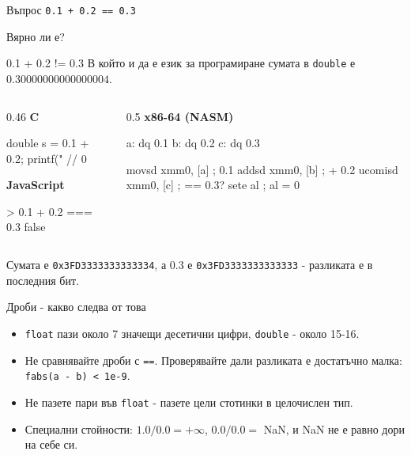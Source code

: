 \documentclass[14pt, aspectratio=169]{beamer}
\begin{document}
\begin{frame}{Въпрос}
  \centering
  \vfill
  {\Large\texttt{0.1 + 0.2 == 0.3}}

  \bigskip
  Вярно ли е?
  \vfill
\end{frame}

\begin{frame}[fragile]{0.1 + 0.2 != 0.3}
  \noindent В който и да е език за програмиране сумата в \texttt{double} е
  $0.30000000000000004$.
  \medskip

  \begin{columns}[T]
    \begin{column}{0.46\textwidth}
      \small\textbf{C}
\begin{semiverbatim}\scriptsize
double s = 0.1 + 0.2;
printf("%
// 0
\end{semiverbatim}
      \seg
      \small\textbf{JavaScript}
\begin{semiverbatim}\scriptsize
> 0.1 + 0.2 === 0.3
false
\end{semiverbatim}
    \end{column}
    \begin{column}{0.5\textwidth}
      \seg
      \small\textbf{x86-64 (NASM)}
\begin{semiverbatim}\scriptsize
a:  dq 0.1
b:  dq 0.2
c:  dq 0.3

movsd   xmm0, [a]  ; 0.1
addsd   xmm0, [b]  ; + 0.2
ucomisd xmm0, [c]  ; == 0.3?
sete    al         ; al = 0
\end{semiverbatim}
    \end{column}
  \end{columns}
  \seg
  \medskip
  \noindent\small Сумата е \texttt{0x3FD3333333333334}, а $0.3$ е
  \texttt{0x3FD3333333333333} - разликата е в последния бит.
\end{frame}

\begin{frame}{Дроби - какво следва от това}
  \begin{itemize}
    \item \texttt{float} пази около 7 значещи десетични цифри, \texttt{double} -
      около 15-16.
    \item Не сравнявайте дроби с \texttt{==}. Проверявайте дали разликата е
      достатъчно малка: \texttt{fabs(a - b) < 1e-9}.
    \item Не пазете пари във \texttt{float} - пазете цели стотинки в
      целочислен тип.
    \item Специални стойности: $1.0 / 0.0 = +\infty$, $0.0 / 0.0 =$ NaN, и NaN
      не е равно дори на себе си.
  \end{itemize}
\end{frame}
\end{document}
